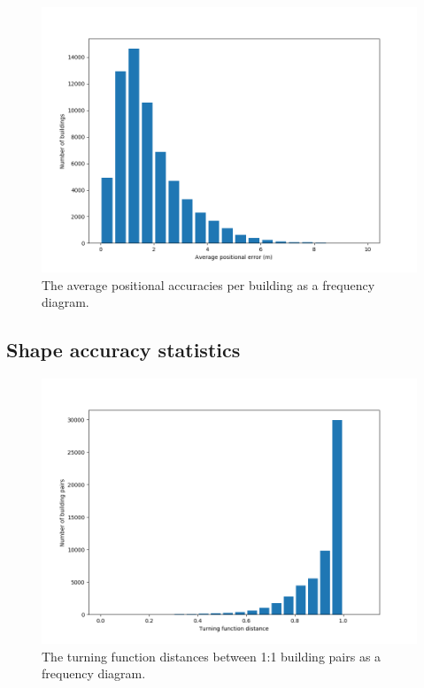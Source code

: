 \documentclass[a4paper]{article}
\begin{document}

\begin{figure}[H]
    \centering
    \includegraphics[width=\textwidth,height=0.5\textheight,keepaspectratio]{img_pos_error_plot}
    \caption{The average positional accuracies per building as a frequency diagram.}
    \label{fig:space}
\end{figure}

\subsection{Shape accuracy statistics}


\begin{figure}[H]
    \centering
    \includegraphics[width=\textwidth,height=0.5\textheight,keepaspectratio]{img_turning_function_plot}
    \caption{The turning function distances between 1:1 building pairs as a frequency diagram.}
    \label{fig:space}
\end{figure}
\end{document}

